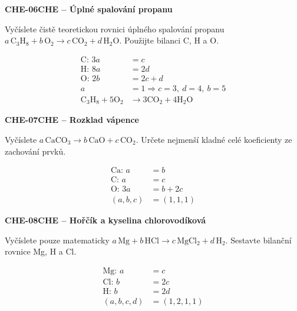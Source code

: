 \documentclass[11pt,a4paper]{article}
\begin{document}
\par\medskip\noindent
\textbf{CHE-06}\quad\textbf{CHE -- Úplné spalování propanu}\par
Vyčíslete čistě teoretickou rovnici úplného spalování propanu $a\,\mathrm{C_3H_8}+b\,\mathrm{O_2}\rightarrow c\,\mathrm{CO_2}+d\,\mathrm{H_2O}$. Použijte bilanci C, H a O.
\par\[\begin{aligned}
\text{C: }3a&=c\\\text{H: }8a&=2d\\\text{O: }2b&=2c+d\\a&=1\Rightarrow c=3,\ d=4,\ b=5\\\mathrm{C_3H_8}+5\mathrm{O_2}&\rightarrow3\mathrm{CO_2}+4\mathrm{H_2O}
\end{aligned}\]
\par\medskip\noindent
\textbf{CHE-07}\quad\textbf{CHE -- Rozklad vápence}\par
Vyčíslete $a\,\mathrm{CaCO_3}\rightarrow b\,\mathrm{CaO}+c\,\mathrm{CO_2}$. Určete nejmenší kladné celé koeficienty ze zachování prvků.
\par\[\begin{aligned}
\text{Ca: }a&=b\\\text{C: }a&=c\\\text{O: }3a&=b+2c\\(a,b,c)&=(1,1,1)
\end{aligned}\]
\par\medskip\noindent
\textbf{CHE-08}\quad\textbf{CHE -- Hořčík a kyselina chlorovodíková}\par
Vyčíslete pouze matematicky $a\,\mathrm{Mg}+b\,\mathrm{HCl}\rightarrow c\,\mathrm{MgCl_2}+d\,\mathrm{H_2}$. Sestavte bilanční rovnice Mg, H a Cl.
\par\[\begin{aligned}
\text{Mg: }a&=c\\\text{Cl: }b&=2c\\\text{H: }b&=2d\\(a,b,c,d)&=(1,2,1,1)
\end{aligned}\]
\end{document}
